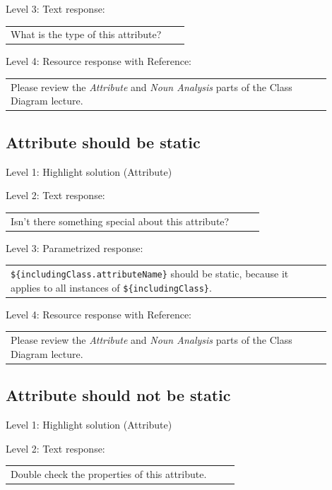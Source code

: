 \noindent Level 3: Text response: \medskip

\begin{tabular}{|p{0.9\linewidth}}
What is the type of this attribute?
\end{tabular} \medskip

\noindent Level 4: Resource response with Reference: \medskip

\begin{tabular}{|p{0.9\linewidth}}
Please review the \textit{Attribute} and \textit{Noun Analysis} parts of the Class Diagram lecture.
\end{tabular} \medskip


\subsection{Attribute should be static}

\noindent Level 1: Highlight solution (Attribute) \medskip

\noindent Level 2: Text response: \medskip

\begin{tabular}{|p{0.9\linewidth}}
Isn't there something special about this attribute?
\end{tabular} \medskip

\noindent Level 3: Parametrized response: \medskip

\begin{tabular}{|p{0.9\linewidth}}
\verb|${includingClass.attributeName}| should be static, because it applies to all instances of \verb|${includingClass}|.
\end{tabular} \medskip

\noindent Level 4: Resource response with Reference: \medskip

\begin{tabular}{|p{0.9\linewidth}}
Please review the \textit{Attribute} and \textit{Noun Analysis} parts of the Class Diagram lecture.
\end{tabular} \medskip


\subsection{Attribute should not be static}

\noindent Level 1: Highlight solution (Attribute) \medskip

\noindent Level 2: Text response: \medskip

\begin{tabular}{|p{0.9\linewidth}}
Double check the properties of this attribute.
\end{tabular} \medskip

